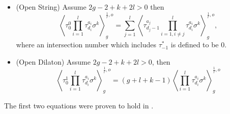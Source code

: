 \documentclass[11pt]{amsart}
\theoremstyle{definition}
\theoremstyle{remark}
\newcommand{\<}{\left<}
\renewcommand{\>}{\right>}
\numberwithin{equation}{section}
\begin{document}
\begin{itemize}
\begin{equation}
\begin{split}
&+\hspace{-0.1cm}\sum_{\substack{J_1 \sqcup J_2 =  [l]\setminus\{1\} \\ k_1+k_2=k}} \hspace{-0.1cm} \binom{k}{k_1}\left\langle \tau^{a_{1}}_{d_{1}}\prod_{i \in J_1} \tau^{a_i}_{d_i}\sigma^{k_1}\right\rangle^{\frac{1}{r},o}_0 \hspace{-0.1cm}\left\langle \prod_{i \in J_2} \tau^{a_i}_{d_i} \sigma^{k_2+1}\right\rangle^{\frac{1}{r}, o}_1\\
&+\frac{1}{2}\left\langle \prod_{i\in [l]}\tau^{a_i}_{d_i}\sigma^{k+1}\right\rangle^{\frac{1}{r},o}_0.
    \end{split}
\end{equation}\label{eq:g=1_trr}
\item[(d)](Open String)
Assume $2g-2+k+2l>0$ then %
\begin{equation}\label{eq:open_string}
\left\langle\tau^0_0\prod_{i=1}^l\tau^{a_i}_{d_i}\sigma^k\right\rangle^{\frac{1}{r},o}_g=\sum_{j=1}^l\left\langle\tau^{a_j}_{d_j-1}\prod_{i=1,i\neq j}^l\tau^{a_i}_{d_i}\sigma^k\right\rangle^{\frac{1}{r},o}_g,
\end{equation}
where an intersection number which includes $\tau^*_{-1}$ is defined to be $0.$
\item[(e)]%
(Open Dilaton)
Assume %
$2g-2+k+2l>0$, %
then
\begin{equation}\label{eq:open_dilaton}
\left\langle\tau^1_0\prod_{i=1}^l\tau^{a_i}_{d_i}\sigma^k\right\rangle^{\frac{1}{r},o}_g=(g+l+k-1)\left\langle\prod_{i=1}^l\tau^{a_i}_{d_i}\sigma^k\right\rangle^{\frac{1}{r},o}_g
\end{equation}
\end{itemize}
The %
first two equations were proven to hold in \cite{BCT2}.
\end{document}
